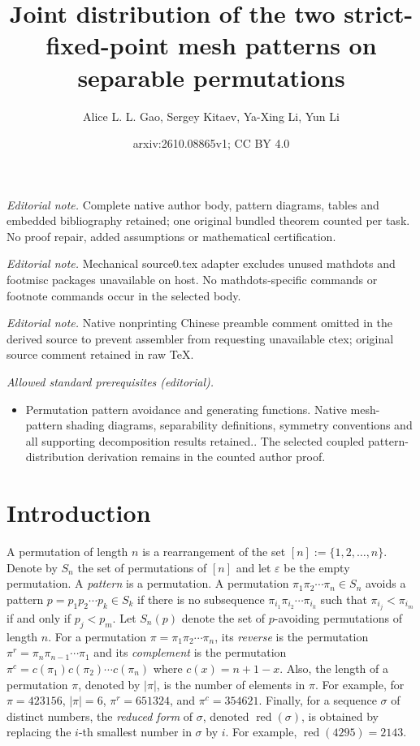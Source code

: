 \documentclass[10pt,a4paper]{article}
\title{Joint distribution of the two strict-fixed-point mesh patterns on separable permutations}
\author{Alice L. L. Gao, Sergey Kitaev, Ya-Xing Li, Yun Li}
\date{arxiv:2610.08865v1; CC BY 4.0}
\DeclareMathOperator{\red}{red}
\begin{document}
\maketitle
\noindent\textit{Editorial note.} Complete native author body, pattern diagrams, tables and embedded bibliography retained; one original bundled theorem counted per task. No proof repair, added assumptions or mathematical certification.\par\medskip
\noindent\textit{Editorial note.} Mechanical source0.tex adapter excludes unused mathdots and footmisc packages unavailable on host. No mathdots-specific commands or footnote commands occur in the selected body.\par\medskip
\noindent\textit{Editorial note.} Native nonprinting Chinese preamble comment omitted in the derived source to prevent assembler from requesting unavailable ctex; original source comment retained in raw TeX.\par\medskip
\noindent\textit{Allowed standard prerequisites (editorial).}\begin{itemize}
\item Permutation pattern avoidance and generating functions. Native mesh-pattern shading diagrams, separability definitions, symmetry conventions and all supporting decomposition results retained.. The selected coupled pattern-distribution derivation remains in the counted author proof.
\end{itemize}\medskip
\section{Introduction}\label{intro}

A permutation of length $n$ is a rearrangement of the set $[n]:=\{1,2,\ldots,n\}$. Denote by  $S_n$  the set of permutations of $[n]$ and let $\varepsilon$ be the empty permutation. A {\em pattern} is a permutation. A permutation $\pi_1\pi_2\cdots\pi_n\in S_n$ avoids a pattern $p=p_1p_2\cdots p_k\in S_k$  if there is no subsequence $\pi_{i_1}\pi_{i_2}\cdots\pi_{i_k}$ such that $\pi_{i_j}<\pi_{i_m}$ if and only if $p_j<p_m$.  Let $S_n(p)$ denote the set of $p$-avoiding permutations of length $n$. For a permutation $\pi=\pi_1\pi_2\cdots\pi_n$, its {\em reverse} is the permutation $\pi^r=\pi_n\pi_{n-1}\cdots \pi_1$ and its {\em complement} is the permutation $\pi^c=c(\pi_1)c(\pi_2)\cdots c(\pi_n)$ where $c(x)=n+1-x$. Also, the length of a permutation $\pi$, denoted by $|\pi|$, is the number of elements in $\pi$. For example, for $\pi=423156$, $|\pi|=6$, $\pi^r=651324$, and $\pi^c=354621$. Finally, for a sequence $\sigma$ of distinct numbers, the {\em reduced form} of $\sigma$, denoted $\red(\sigma)$, is obtained by replacing the $i$-th smallest number in $\sigma$ by $i$. For example, $\red(4295)=2143$. 
\end{document}
